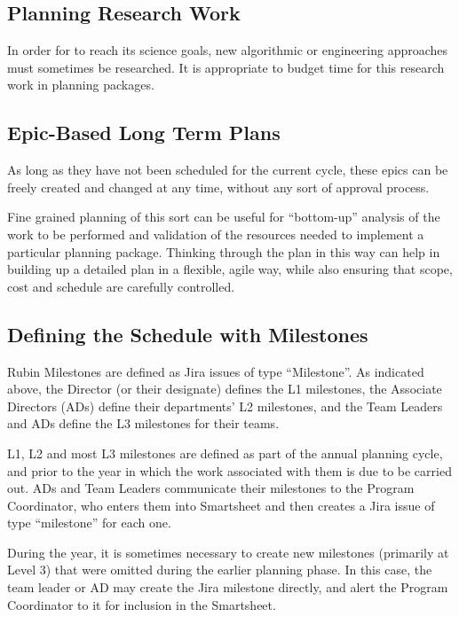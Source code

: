\subsection{Planning Research Work}
\label{sec:long-term-research}

In order for \RO  to reach its science goals, new algorithmic or engineering approaches must sometimes be researched.
It is appropriate to budget time for this research work in planning packages.


\subsection{Epic-Based Long Term Plans}

As long as they have not been scheduled for the current \gls{cycle}, these \glspl{epic} can be freely created and changed at any time, without any sort of approval process.

Fine grained planning of this sort can be useful for ``bottom-up''
analysis of the work to be performed and validation of the resources
needed to implement a particular planning package. Thinking through the
plan in this way can help in building up a detailed plan in a flexible,
agile way, while also ensuring that scope, cost and schedule are
carefully controlled.


\subsection{Defining the Schedule with Milestones}

Rubin Milestones are defined as Jira issues of type ``Milestone''. As indicated above, the Director (or their designate) defines the L1 milestones, the Associate Directors (ADs) define their departments' L2 milestones, and the Team Leaders and ADs define the L3 milestones for their teams.

L1, L2 and most L3 milestones are defined as part of the annual planning cycle, and prior to the year in which the work associated with them is due to be carried out. ADs and Team Leaders communicate their milestones to the Program Coordinator, who enters them into Smartsheet and then creates a Jira issue of type ``milestone'' for each one.

During the year, it is sometimes necessary to create new milestones (primarily at Level 3) that were omitted during the earlier planning phase. In this case, the team leader or AD may create the Jira milestone directly, and alert the Program Coordinator to it for inclusion in the Smartsheet.

